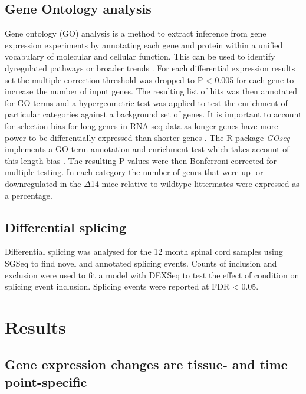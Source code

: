 \subsection{Gene Ontology analysis}
Gene ontology (GO) analysis is a method to extract inference from gene expression experiments by annotating each gene and protein within a unified vocabulary of molecular and cellular function. This can be used to identify dyregulated pathways or broader trends \citep{Ashburner2000}. For each differential expression results set the multiple correction threshold was dropped to P < 0.005 for each gene to increase the number of input genes. The resulting list of hits was then annotated for GO terms and a hypergeometric test was applied to test the enrichment of particular categories against a background set of genes. It is important to account for selection bias for long genes in RNA-seq data as longer genes have more power to be differentially expressed than shorter genes \citep{Young2010}. The R package \textit{GOseq} implements a GO term annotation and enrichment test which takes account of this length bias \citep{Young2010}. The resulting P-values were then Bonferroni corrected for multiple testing. In each category the number of genes that were up- or downregulated in the $\Delta$14 mice relative to wildtype littermates were expressed as a percentage. 

\subsection{Differential splicing}
Differential splicing was analysed for the 12 month spinal cord samples using SGSeq \citep{Goldstein2016} to find novel and annotated splicing events. Counts of inclusion and exclusion were used to fit a model with DEXSeq \citep{Anders2012} to test the effect of condition on splicing event inclusion. Splicing events were reported at FDR < 0.05.

\section{Results}

\subsection{Gene expression changes are tissue- and time point-specific}

